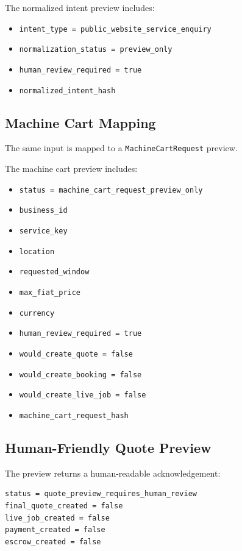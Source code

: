 The normalized intent preview includes:

\begin{itemize}
  \item \texttt{intent\_type = public\_website\_service\_enquiry}
  \item \texttt{normalization\_status = preview\_only}
  \item \texttt{human\_review\_required = true}
  \item \texttt{normalized\_intent\_hash}
\end{itemize}

\subsection{Machine Cart Mapping}

The same input is mapped to a \texttt{MachineCartRequest} preview.

The machine cart preview includes:

\begin{itemize}
  \item \texttt{status = machine\_cart\_request\_preview\_only}
  \item \texttt{business\_id}
  \item \texttt{service\_key}
  \item \texttt{location}
  \item \texttt{requested\_window}
  \item \texttt{max\_fiat\_price}
  \item \texttt{currency}
  \item \texttt{human\_review\_required = true}
  \item \texttt{would\_create\_quote = false}
  \item \texttt{would\_create\_booking = false}
  \item \texttt{would\_create\_live\_job = false}
  \item \texttt{machine\_cart\_request\_hash}
\end{itemize}

\subsection{Human-Friendly Quote Preview}

The preview returns a human-readable acknowledgement:

\begin{verbatim}
status = quote_preview_requires_human_review
final_quote_created = false
live_job_created = false
payment_created = false
escrow_created = false
\end{verbatim}

